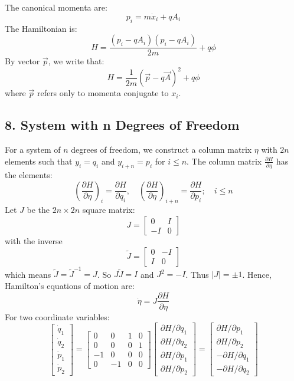 \documentclass[12pt]{article}
\begin{document}
	The canonical momenta are:
	\[ p_i = m\dot{x}_i + qA_i \]
	The Hamiltonian is:
	\[ H = \frac{(p_i - qA_i)(p_i - qA_i)}{2m} + q\phi \]
	By vector $\vec{p}$, we write that:
	\[ H = \frac{1}{2m}(\vec{p} - q\vec{A})^2 + q\phi \]
	where $\vec{p}$ refers only to momenta conjugate to $x_i$.
	
	\subsection*{8. System with n Degrees of Freedom}
	For a system of $n$ degrees of freedom, we construct a column matrix $\eta$ with $2n$ elements such that $y_i = q_i$ and $y_{i+n} = p_i$ for $i \leq n$.
	The column matrix $\frac{\partial H}{\partial \eta}$ has the elements:
	\[ \left( \frac{\partial H}{\partial \eta} \right)_i = \frac{\partial H}{\partial q_i}, \quad \left( \frac{\partial H}{\partial \eta} \right)_{i+n} = \frac{\partial H}{\partial p_i}; \quad i \leq n \]
	Let $J$ be the $2n \times 2n$ square matrix:
	\[ J = \begin{bmatrix} 0 & I \\ -I & 0 \end{bmatrix} \]
	with the inverse
	\[ \tilde{J} = \begin{bmatrix} 0 & -I \\ I & 0 \end{bmatrix} \]
	which means $\tilde{J} = \tilde{J}^{-1} = J$. So $J\tilde{J}=I$ and $J^2 = -I$.
	Thus $|J| = \pm 1$.
	Hence, Hamilton's equations of motion are:
	\[ \dot{\eta} = J \frac{\partial H}{\partial \eta} \]
	For two coordinate variables:
	\[ \begin{bmatrix} \dot{q}_1 \\ \dot{q}_2 \\ \dot{p}_1 \\ \dot{p}_2 \end{bmatrix} = \begin{bmatrix} 0 & 0 & 1 & 0 \\ 0 & 0 & 0 & 1 \\ -1 & 0 & 0 & 0 \\ 0 & -1 & 0 & 0 \end{bmatrix} \begin{bmatrix} \partial H / \partial q_1 \\ \partial H / \partial q_2 \\ \partial H / \partial p_1 \\ \partial H / \partial p_2 \end{bmatrix} = \begin{bmatrix} \partial H / \partial p_1 \\ \partial H / \partial p_2 \\ -\partial H / \partial q_1 \\ -\partial H / \partial q_2 \end{bmatrix} \]
	
\end{document}
